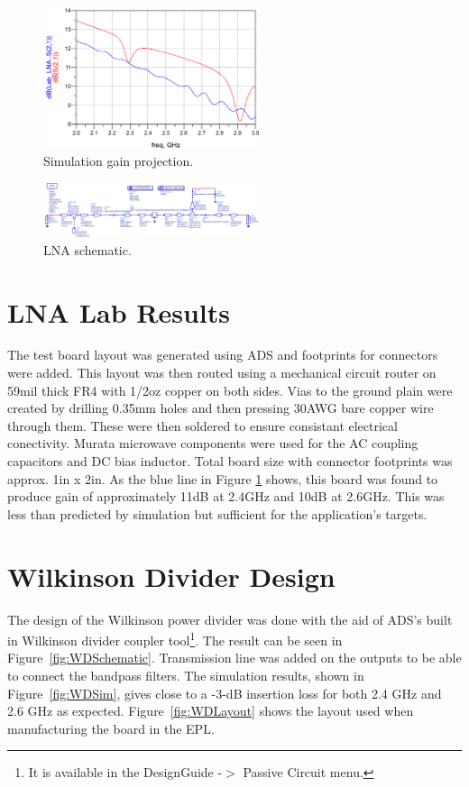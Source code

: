 \documentclass[conference]{IEEEtran}
\begin{document}
\begin{figure}[!h]
\centering
\includegraphics[width=2.5in]{amplifier_simulation_pics/lnaS21.PNG}
\caption{Simulation gain projection.}
\label{fig:LNA_sim_gain}
\end{figure}

\begin{figure}[!h]
\centering
\includegraphics[width=2.5in]{amplifier_simulation_pics/lnaSchematic.PNG}
\caption{LNA schematic.}
\label{fig:lna_schematic}
\end{figure}

\section{LNA Lab Results}
The test board layout was generated using ADS and footprints for connectors were added. This layout was then routed using a mechanical circuit router on 59mil thick FR4 with 1/2oz copper on both sides. Vias to the ground plain were created by drilling 0.35mm holes and then pressing 30AWG bare copper wire through them. These were then soldered to ensure consistant electrical conectivity. Murata microwave components were used for the AC coupling capacitors and DC bias inductor. Total board size with connector footprints was approx. 1in x 2in. As the blue line in Figure \ref{fig:LNA_sim_gain} shows, this board was  found to produce gain of approximately 11dB at 2.4GHz and 10dB at 2.6GHz. This was less than predicted by simulation but sufficient for the application's targets.


\section{Wilkinson Divider Design}
The design of the Wilkinson power divider was done with the aid of ADS's built in Wilkinson divider coupler tool\footnote{It is available in the DesignGuide -$>$ Passive Circuit menu.}.  The result can be seen in Figure~\ref{fig:WDSchematic}.  Transmission line was added on the outputs to be able to connect the bandpass filters.  The simulation results, shown in Figure~\ref{fig:WDSim}, gives close to a -3-dB insertion loss for both 2.4 GHz and 2.6 GHz as expected.  Figure~\ref{fig:WDLayout} shows the layout used when manufacturing the board in the EPL.
\end{document}
